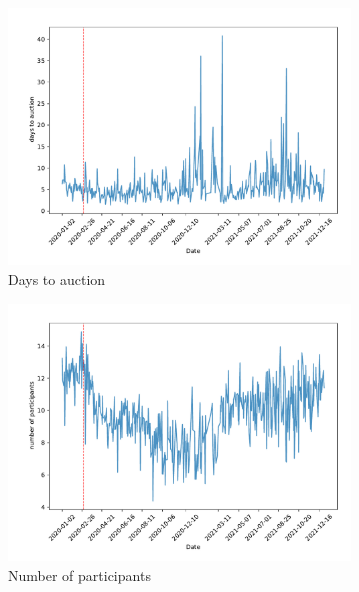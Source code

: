 \documentclass[11pt,a4paper]{article}
\begin{document}
\pagebreak
\begin{figure}[h]
  \centering
  \begin{subfigure}[b]{0.49\textwidth}
      \includegraphics[width=0.998\textwidth]{../results/figures/DaysToAuction_mean_mat30_loan1_timeseries_nr_4_4.75.pdf}
      \caption{Days to auction}
     \end{subfigure}
     \begin{subfigure}[b]{0.49\textwidth}
      \includegraphics[width=0.998\textwidth]{../results/figures/Number of Participants_mean_mat30_loan1_timeseries_nr_4_4.75.pdf}
      \caption{ Number of participants}
     \end{subfigure}
     \begin{subfigure}[b]{0.49\textwidth}

\end{subfigure}
\end{figure}
\end{document}

